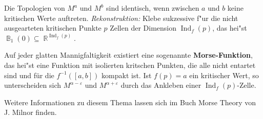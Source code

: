 \documentclass[paper=A4, twoside, chapterprefix=true, bibliography=totoc, headsepline]{scrbook}
\let\temp\phi{}
\let\phi\varphi{}
\let\varphi\temp{}
\let\temp\theta{}
\let\theta\vartheta{}
\let\vartheta\temp{}
\let\temp\epsilon{}
\let\epsilon\varepsilon{}
\let\varepsilon\temp{}
\let\temp\rho{}
\let\rho\varrho{}
\let\varrho\temp{}
\DeclareMathOperator{\R}{\mathbb{R}}
\DeclareMathOperator{\B}{\mathbb{B}} %
\DeclareMathOperator{\Ind}{Ind}     %
\theoremstyle{plain}
\theoremstyle{nonumberplain}
\theoremstyle{empty}
\theoremstyle{break}
\newcommand{\CmIndex}[2][]{\ifthenelse{\isempty{#1}}{\index{#2}}{\index{#1}}#2}
\newcommand{\CmMark}[2][]{\textbf{\CmIndex[#1]{#2}}}
\newcommand{\quot}[1]{\textrm{\glqq}{#1}\textrm{\grqq}}
\begin{document}
\begin{center}
\end{center}
Die Topologien von $M^a$ und $M^b$ sind identisch, wenn zwischen $a$ und $b$ keine kritischen Werte auftreten.
\emph{\quot{Rekonstruktion}:} Klebe sukzessive f"ur die nicht ausgearteten kritischen Punkte $p$ Zellen der Dimension $\Ind_f(p)$, das hei"st $\B_1(0) \subseteq \R^{\Ind_f(p)}$.


Auf jeder glatten Mannigfaltigkeit existiert eine sogenannte \CmMark{Morse-Funktion}, das hei"st eine Funktion mit isolierten kritschen Punkten, die alle nicht entartet sind und für die $f^{-1}([a,b])$ kompakt ist.
Ist $f(p) = a$ ein kritischer Wert, so unterscheiden sich $M^{\alpha - \epsilon}$ und $M^{\alpha + \epsilon}$ durch das Ankleben einer $\Ind_f(p)$-Zelle.

Weitere Informationen zu diesem Thema lassen sich im Buch \quot{Morse Theory} von J. Milnor \cite{milnor1963morsetheo} finden.
\end{document}
